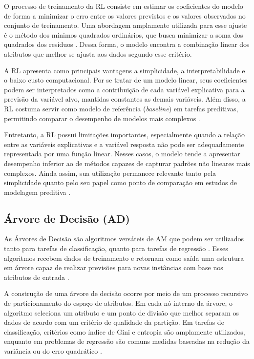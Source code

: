 O processo de treinamento da RL consiste em estimar os coeficientes do modelo de forma a minimizar o erro entre os valores previstos e os valores observados no 
conjunto de treinamento. Uma abordagem amplamente utilizada para esse ajuste é o método dos mínimos quadrados ordinários, que busca minimizar a soma 
dos quadrados dos resíduos \cite{Geron2019}. Dessa forma, o modelo encontra a combinação linear dos atributos que melhor se ajusta aos dados segundo esse critério.

A RL apresenta como principais vantagens a simplicidade, a interpretabilidade e o baixo custo computacional. Por se tratar de um modelo linear, seus 
coeficientes podem ser interpretados como a contribuição de cada variável explicativa para a previsão da variável alvo, mantidas constantes as demais variáveis. 
Além disso, a RL costuma servir como modelo de referência (\textit{baseline}) em tarefas preditivas, permitindo comparar o 
desempenho de modelos mais complexos \cite{Geron2019}.

Entretanto, a RL possui limitações importantes, especialmente quando a relação entre as variáveis explicativas e a variável resposta não pode ser adequadamente 
representada por uma função linear. Nesses casos, o modelo tende a apresentar desempenho inferior ao de métodos capazes de capturar padrões não lineares mais complexos. 
Ainda assim, sua utilização permanece relevante tanto pela simplicidade quanto pelo seu papel como ponto de comparação em estudos de modelagem preditiva \cite{Geron2019}.

\subsection{Árvore de Decisão (AD)}

As Árvores de Decisão são algoritmos versáteis de AM que podem ser utilizados tanto para tarefas de classificação, quanto para tarefas de regressão \cite{Geron2019}. 
Esses algoritmos recebem dados de treinamento e retornam como saída uma estrutura em árvore capaz de realizar previsões para novas instâncias 
com base nos atributos de entrada \cite{Geron2019}.

A construção de uma árvore de decisão ocorre por meio de um processo recursivo de particionamento do espaço de atributos. Em cada nó interno da árvore, 
o algoritmo seleciona um atributo e um ponto de divisão que melhor separam os dados de acordo com um critério de qualidade da partição. 
Em tarefas de classificação, critérios como índice de Gini e entropia são amplamente utilizados, enquanto em problemas de regressão são comuns medidas 
baseadas na redução da variância ou do erro quadrático \cite{Geron2019}.

